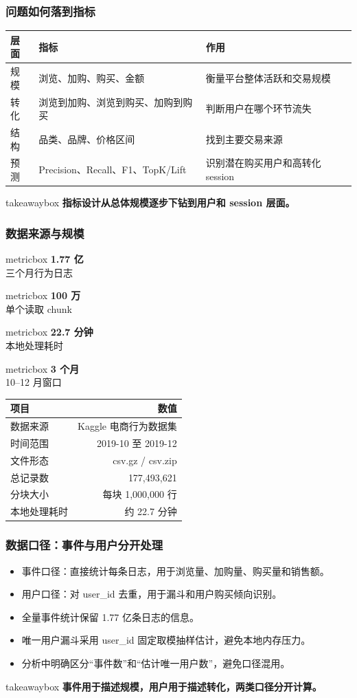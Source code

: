 \documentclass[aspectratio=169]{ctexbeamer}
\newcommand{\keytakeaway}[1]{%
  \vspace{0.10cm}
  \begin{beamercolorbox}[wd=\textwidth,sep=5pt]{takeawaybox}
    \small\textbf{#1}
  \end{beamercolorbox}
}
\newcommand{\metriccard}[2]{%
  \begin{minipage}[t]{0.23\textwidth}
    \begin{beamercolorbox}[wd=\linewidth,center,sep=5pt]{metricbox}
      {\Large\bfseries #1}\\[-1pt]
      {\scriptsize #2}
    \end{beamercolorbox}
  \end{minipage}
}
\begin{document}
\begin{frame}
  \frametitle{问题如何落到指标}
  \begin{table}
  \centering
  \begin{tabular}{p{}p{}p{}}
  \toprule
  层面 & 指标 & 作用 \\
  \midrule
  规模 & 浏览、加购、购买、金额 & 衡量平台整体活跃和交易规模 \\
  转化 & 浏览到加购、浏览到购买、加购到购买 & 判断用户在哪个环节流失 \\
  结构 & 品类、品牌、价格区间 & 找到主要交易来源 \\
  预测 & Precision、Recall、F1、TopK/Lift & 识别潜在购买用户和高转化 session \\
  \bottomrule
  \end{tabular}
  \end{table}
  \keytakeaway{指标设计从总体规模逐步下钻到用户和 session 层面。}
\end{frame}

\begin{frame}
  \frametitle{数据来源与规模}
  \centering
  \metriccard{1.77 亿}{三个月行为日志}\hfill
  \metriccard{100 万}{单个读取 chunk}\hfill
  \metriccard{22.7 分钟}{本地处理耗时}\hfill
  \metriccard{3 个月}{10--12 月窗口}
  \vspace{0.35cm}
  \begin{table}
  \centering
  \begin{tabular}{lr}
  \toprule
  项目 & 数值 \\
  \midrule
  数据来源 & Kaggle 电商行为数据集 \\
  时间范围 & 2019-10 至 2019-12 \\
  文件形态 & csv.gz / csv.zip \\
  总记录数 & 177,493,621 \\
  分块大小 & 每块 1,000,000 行 \\
  本地处理耗时 & 约 22.7 分钟 \\
  \bottomrule
  \end{tabular}
  \end{table}
\end{frame}

\begin{frame}
  \frametitle{数据口径：事件与用户分开处理}
  \begin{itemize}
    \item 事件口径：直接统计每条日志，用于浏览量、加购量、购买量和销售额。
    \item 用户口径：对 user\_id 去重，用于漏斗和用户购买倾向识别。
    \item 全量事件统计保留 1.77 亿条日志的信息。
    \item 唯一用户漏斗采用 user\_id 固定取模抽样估计，避免本地内存压力。
    \item 分析中明确区分“事件数”和“估计唯一用户数”，避免口径混用。
  \end{itemize}
  \keytakeaway{事件用于描述规模，用户用于描述转化，两类口径分开计算。}
\end{frame}
\end{document}
